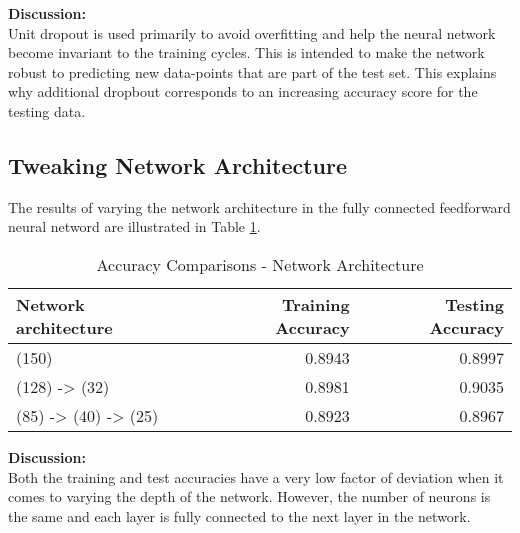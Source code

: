 \documentclass[parskip=half]{scrartcl}
\begin{document}
        \textbf{Discussion:}\\
        Unit dropout is used primarily to avoid overfitting and help the neural network become invariant to the training cycles. This is intended to make the network robust to predicting new data-points that are part of the test set. This explains why additional dropbout corresponds to an increasing accuracy score for the testing data.

    

    \subsection{Tweaking Network Architecture} %
    \label{sub:tweaking_network_architecture}

        The results of varying the network architecture in the fully connected feedforward neural netword are illustrated in Table \ref{tab:accuracy_comparisons_network_architecture}.

        \begin{table}[th]
            \centering
            \begin{tabular}{| l | r | r |}
            \hline
            \textbf{Network architecture} & \textbf{Training Accuracy} & \textbf{Testing Accuracy} \\
            \hline
                \hline
                (150) & 0.8943 & 0.8997 \\
                \hline
                (128) -> (32) & 0.8981 & 0.9035 \\
                \hline
                (85) -> (40) -> (25) & 0.8923 & 0.8967 \\
            \hline
            \end{tabular}
            \caption{Accuracy Comparisons - Network Architecture}
            \label{tab:accuracy_comparisons_network_architecture}
        \end{table}

        \textbf{Discussion:}\\
        Both the training and test accuracies have a very low factor of deviation when it comes to varying the depth of the network. However, the number of neurons is the same and each layer is fully connected to the next layer in the network.
    
    

\end{document}
